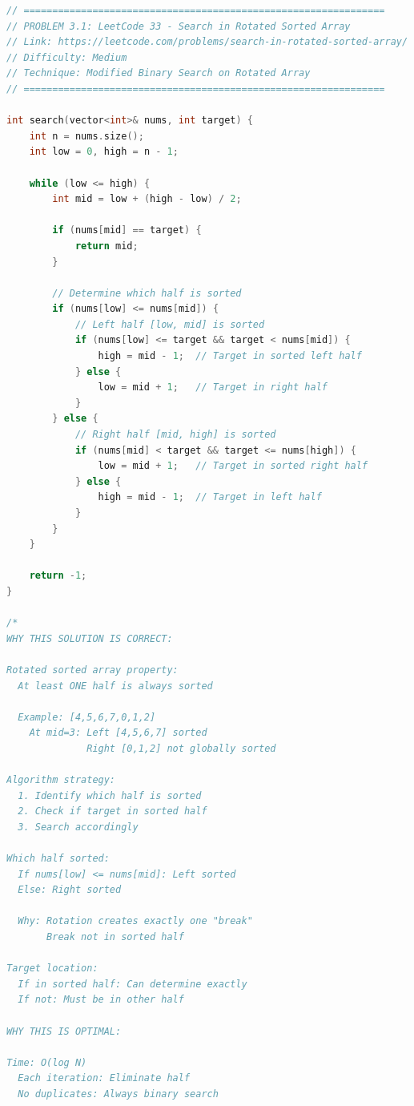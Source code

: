 \documentclass[11pt,a4paper,oneside]{book}
\begin{document}
\begin{lstlisting}[language=C++, caption=Complete Rotated Array Solutions]
// ===============================================================
// PROBLEM 3.1: LeetCode 33 - Search in Rotated Sorted Array
// Link: https://leetcode.com/problems/search-in-rotated-sorted-array/
// Difficulty: Medium
// Technique: Modified Binary Search on Rotated Array
// ===============================================================

int search(vector<int>& nums, int target) {
    int n = nums.size();
    int low = 0, high = n - 1;
    
    while (low <= high) {
        int mid = low + (high - low) / 2;
        
        if (nums[mid] == target) {
            return mid;
        }
        
        // Determine which half is sorted
        if (nums[low] <= nums[mid]) {
            // Left half [low, mid] is sorted
            if (nums[low] <= target && target < nums[mid]) {
                high = mid - 1;  // Target in sorted left half
            } else {
                low = mid + 1;   // Target in right half
            }
        } else {
            // Right half [mid, high] is sorted
            if (nums[mid] < target && target <= nums[high]) {
                low = mid + 1;   // Target in sorted right half
            } else {
                high = mid - 1;  // Target in left half
            }
        }
    }
    
    return -1;
}

/*
WHY THIS SOLUTION IS CORRECT:

Rotated sorted array property:
  At least ONE half is always sorted
  
  Example: [4,5,6,7,0,1,2]
    At mid=3: Left [4,5,6,7] sorted 
              Right [0,1,2] not globally sorted

Algorithm strategy:
  1. Identify which half is sorted
  2. Check if target in sorted half
  3. Search accordingly

Which half sorted:
  If nums[low] <= nums[mid]: Left sorted
  Else: Right sorted
  
  Why: Rotation creates exactly one "break"
       Break not in sorted half

Target location:
  If in sorted half: Can determine exactly
  If not: Must be in other half

WHY THIS IS OPTIMAL:

Time: O(log N)
  Each iteration: Eliminate half
  No duplicates: Always binary search


\end{lstlisting}
\end{document}
